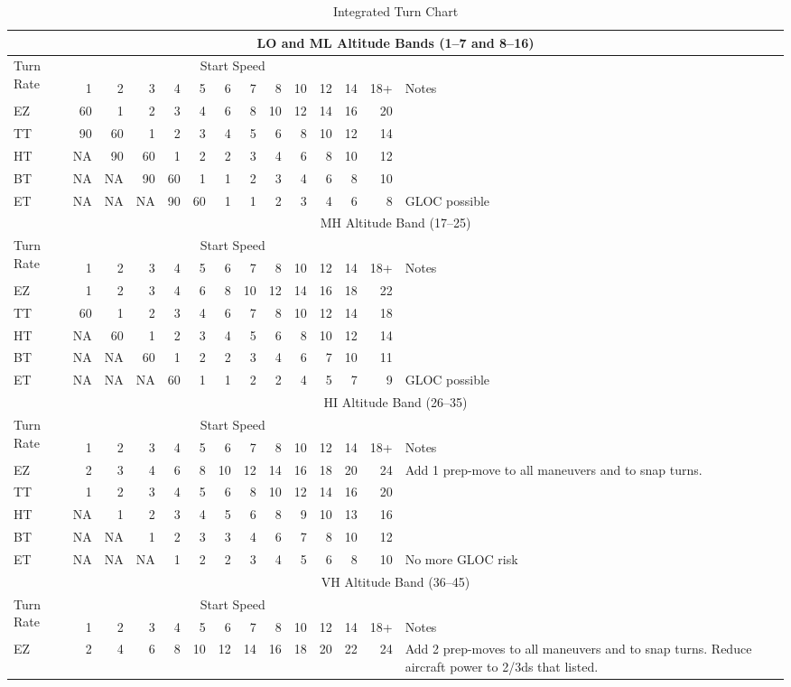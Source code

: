 \begin{table*}
\centering
\caption{Integrated Turn Chart}
\medskip
\begin{tabular}{p{3em}*{12}{r}p{12em}}
\hline
\multicolumn{14}{c}{LO and ML Altitude Bands (1--7 and 8--16)}\\
\hline
\multirow{2}{=}{Turn Rate}&\multicolumn{12}{c}{Start Speed}\\
&1&2&3&4&5&6&7&8&10&12&14&18+&Notes\\
\hline
EZ&60&1&2&3&4&6&8&10&12&14&16&20\\
TT&90&60&1&2&3&4&5&6&8&10&12&14\\
HT&NA&90&60&1&2&2&3&4&6&8&10&12\\
BT&NA&NA&90&60&1&1&2&3&4&6&8&10\\
ET&NA&NA&NA&90&60&1&1&2&3&4&6&8&GLOC possible\\
\hline
\multicolumn{14}{c}{MH Altitude Band (17--25)}\\
\hline
\multirow{2}{=}{Turn Rate}&\multicolumn{12}{c}{Start Speed}\\
&1&2&3&4&5&6&7&8&10&12&14&18+&Notes\\
\hline
EZ&1&2&3&4&6&8&10&12&14&16&18&22\\
TT&60&1&2&3&4&6&7&8&10&12&14&18\\
HT&NA&60&1&2&3&4&5&6&8&10&12&14\\
BT&NA&NA&60&1&2&2&3&4&6&7&10&11\\
ET&NA&NA&NA&60&1&1&2&2&4&5&7&9&GLOC possible\\
\hline
\multicolumn{14}{c}{HI Altitude Band (26--35)}\\
\hline
\multirow{2}{=}{Turn Rate}&\multicolumn{12}{c}{Start Speed}\\
&1&2&3&4&5&6&7&8&10&12&14&18+&Notes\\
\hline
EZ&2&3&4&6&8&10&12&14&16&18&20&24&\multirow[t]{4}{=}{Add 1 prep-move to all maneuvers and to snap turns.}\\
TT&1&2&3&4&5&6&8&10&12&14&16&20\\
HT&NA&1&2&3&4&5&6&8&9&10&13&16\\
BT&NA&NA&1&2&3&3&4&6&7&8&10&12\\
ET&NA&NA&NA&1&2&2&3&4&5&6&8&10&No more GLOC risk\\
\hline
\multicolumn{14}{c}{VH Altitude Band (36--45)}\\
\hline
\multirow{2}{=}{Turn Rate}&\multicolumn{12}{c}{Start Speed}\\
&1&2&3&4&5&6&7&8&10&12&14&18+&Notes\\
\hline
EZ&2&4&6&8&10&12&14&16&18&20&22&24&\multirow[t]{5}{=}{Add 2 prep-moves to all maneuvers and to snap turns. Reduce aircraft power to 2/3ds that listed.}\\

\end{tabular}
\end{table*}
